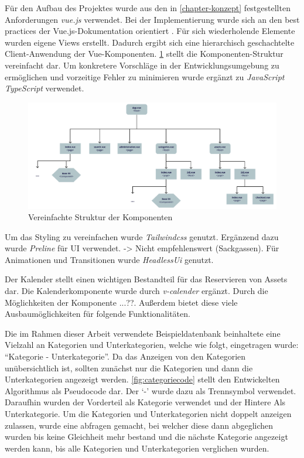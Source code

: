 Für den Aufbau des Projektes wurde aus den in \ref{chapter-konzept} festgestellten Anforderungen
\textit{vue.js} verwendet. Bei der Implementierung wurde sich an den best practices der
Vue.js-Dokumentation orientiert . Für sich wiederholende Elemente wurden
eigene Views erstellt. Dadurch ergibt sich eine hierarchisch geschachtelte Client-Anwendung der
Vue-Komponenten. \ref{fig:Komponenten} stellt die Komponenten-Struktur vereinfacht dar. Um
konkretere Vorschläge in der Entwicklungsumgebung zu ermöglichen und vorzeitige Fehler zu minimieren
wurde ergänzt zu \textit{JavaScript} \textit{TypeScript} verwendet.

\begin{figure}[h]
  \centering
  \includegraphics[scale=0.5]{Bilder/struktur.pdf}
  \caption[Vereinfachte Struktur der Komponenten]{Vereinfachte Struktur der Komponenten}
  \label{fig:Komponenten}
\end{figure}

Um das Styling zu vereinfachen wurde \textit{Tailwindcss} genutzt. Ergänzend dazu wurde
\textit{Preline} für UI verwendet. -> Nicht empfehlenswert (Sackgassen).
Für Animationen und Transitionen wurde \textit{HeadlessUi} genutzt.

Der Kalender stellt einen wichtigen Bestandteil für das Reservieren von Assets dar. Die
Kalenderkomponente wurde durch \textit{v-calender} ergänzt. Durch die Möglichkeiten der Komponente
...??. Außerdem bietet diese viele Ausbaumöglichkeiten für folgende Funktionalitäten.

Die im Rahmen dieser Arbeit verwendete Beispieldatenbank beinhaltete eine Vielzahl an Kategorien und
Unterkategorien, welche wie folgt, eingetragen wurde: \enquote{Kategorie - Unterkategorie}. Da das
Anzeigen von den Kategorien unübersichtlich ist, sollten zunächst nur die Kategorien und dann die
Unterkategorien angezeigt werden. \ref{fig:categoriecode} stellt den Entwickelten Algorithmus als
Pseudocode dar. Der \enquote*{-} wurde dazu als Trennsymbol verwendet. Daraufhin wurden der
Vorderteil als Kategorie verwendet und der Hintere Als Unterkategorie. Um die Kategorien und
Unterkategorien nicht doppelt anzeigen zulassen, wurde eine abfragen gemacht, bei welcher diese dann
abgeglichen wurden bis keine Gleichheit mehr bestand und die nächste Kategorie angezeigt werden
kann, bis alle Kategorien und Unterkategorien verglichen wurden.

